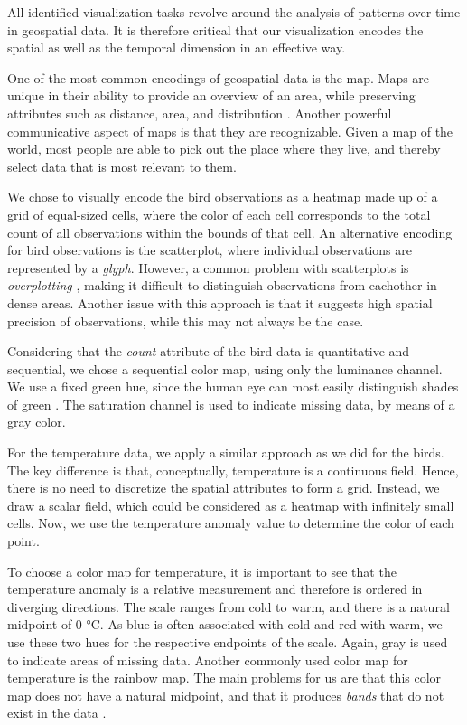\documentclass[journal]{vgtc}                %
\begin{document}
All identified visualization tasks revolve around the analysis of patterns over time in geospatial data. It is therefore critical that our visualization encodes the spatial as well as the temporal dimension in an effective way.

One of the most common encodings of geospatial data is the map. Maps are unique in their ability to provide an overview of an area, while preserving attributes such as distance, area, and distribution \cite{kraak2020cartography}. Another powerful communicative aspect of maps is that they are recognizable. Given a map of the world, most people are able to pick out the place where they live, and thereby select data that is most relevant to them.

We chose to visually encode the bird observations as a heatmap \cite{munzner2014visualization} made up of a grid of equal-sized cells, where the color of each cell corresponds to the total count of all observations within the bounds of that cell. An alternative encoding for bird observations is the scatterplot, where individual observations are represented by a \emph{glyph}. However, a common problem with scatterplots is \emph{overplotting} \cite{micallef2017scatter}, making it difficult to distinguish observations from eachother in dense areas. Another issue with this approach is that it suggests high spatial precision of observations, while this may not always be the case.

Considering that the \emph{count} attribute of the bird data is quantitative and sequential, we chose a sequential color map, using only the luminance channel. We use a fixed green hue, since the human eye can most easily distinguish shades of green \cite{robinson1984fluorescent}. The saturation channel is used to indicate missing data, by means of a gray color.

For the temperature data, we apply a similar approach as we did for the birds. The key difference is that, conceptually, temperature is a continuous field. Hence, there is no need to discretize the spatial attributes to form a grid. Instead, we draw a scalar field, which could be considered as a heatmap with infinitely small cells. Now, we use the temperature anomaly value to determine the color of each point.

To choose a color map for temperature, it is important to see that the temperature anomaly is a relative measurement and therefore is ordered in diverging directions. The scale ranges from cold to warm, and there is a natural midpoint of 0 °C. As blue is often associated with cold and red with warm, we use these two hues for the respective endpoints of the scale. Again, gray is used to indicate areas of missing data. Another commonly used color map for temperature is the rainbow map. The main problems for us are that this color map does not have a natural midpoint, and that it produces \emph{bands} that do not exist in the data \cite{borland2007rainbow}.
\end{document}
